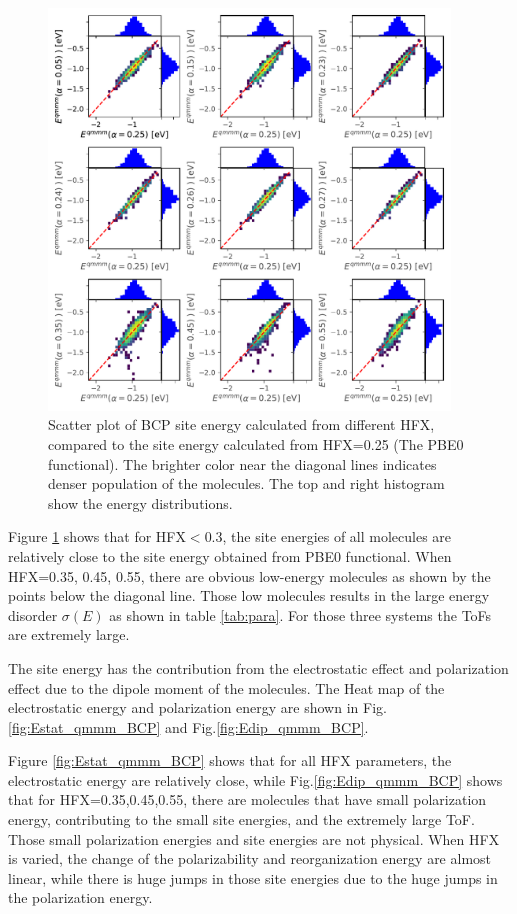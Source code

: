 \documentclass[letterpaper,12pt]{article}
\begin{document}
\begin{figure}[H]
    \centering
    \includegraphics[width=0.95\textwidth]{figs/BCP_HFX/scatterE_qmmm.pdf}
    \caption{Scatter plot of BCP site energy calculated from different HFX, compared to the site energy calculated from HFX=0.25 (The PBE0 functional). The brighter color near the diagonal lines indicates denser population of the molecules.  The top and right histogram show the energy distributions.}
    \label{fig:E_qmmm_BCP}
\end{figure}

Figure \ref{fig:E_qmmm_BCP} shows that for HFX$<0.3$, the site energies of all molecules are relatively close to the site energy obtained from PBE0 functional. When HFX=0.35, 0.45, 0.55, there are obvious low-energy molecules as shown by the points below the diagonal line. 
Those low molecules results in the large energy disorder $\sigma(E)$ as shown in table \ref{tab:para}. 
For those three systems the ToFs are extremely large. 

The site energy has the contribution from the electrostatic effect and polarization effect due to the dipole moment of the molecules. 
The Heat map of the electrostatic energy and polarization energy are shown in Fig.\ref{fig:Estat_qmmm_BCP} and Fig.\ref{fig:Edip_qmmm_BCP}. 

Figure \ref{fig:Estat_qmmm_BCP} shows that for all HFX parameters, the electrostatic energy are relatively close, while Fig.\ref{fig:Edip_qmmm_BCP} shows that for HFX=0.35,0.45,0.55, there are molecules that have small polarization energy, contributing to the small site energies, and the extremely large ToF. 
Those small polarization energies and site energies are not physical. 
When HFX is varied, the change of the polarizability and reorganization energy are almost linear, while there is huge jumps in those site energies due to the huge jumps in the polarization energy. 
\end{document}
